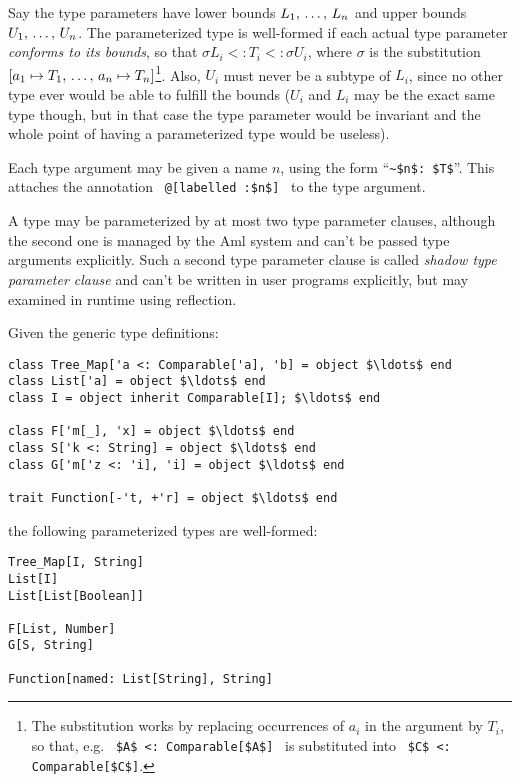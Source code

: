 Say the type parameters have lower bounds $L_1 ,\, \ldots ,\, L_n$ and upper bounds $U_1 ,\, \ldots ,\, U_n$. The parameterized type is well-formed if each actual type parameter {\em conforms to its bounds}, so that $\sigma L_i <: T_i <: \sigma U_i$, where $\sigma$ is the substitution $[a_1 \mapsto T_1 ,\, \ldots ,\, a_n \mapsto T_n]$\footnote{The substitution works by replacing occurrences of $a_i$ in the argument by $T_i$, so that, e.g. ~\lstinline!$A$ <: Comparable[$A$]!~ is substituted into ~\lstinline!$C$ <: Comparable[$C$]!.}. Also, $U_i$ must never be a subtype of $L_i$, since no other type ever would be able to fulfill the bounds ($U_i$ and $L_i$ may be the exact same type though, but in that case the type parameter would be invariant and the whole point of having a parameterized type would be useless). 

Each type argument may be given a name $n$, using the form ``\lstinline!~$n$: $T$!''. This attaches the annotation ~\lstinline!@[labelled :$n$]!~ to the type argument. 

A type may be parameterized by at most two type parameter clauses, although the second one is managed by the Aml system and can't be passed type arguments explicitly. Such a second type parameter clause is called {\em shadow type parameter clause} and can't be written in user programs explicitly, but may examined in runtime using reflection. 

\example
\label{example:parameterized-types}
Given the generic type definitions: 

\begin{lstlisting}
class Tree_Map['a <: Comparable['a], 'b] = object $\ldots$ end
class List['a] = object $\ldots$ end
class I = object inherit Comparable[I]; $\ldots$ end

class F['m[_], 'x] = object $\ldots$ end
class S['k <: String] = object $\ldots$ end
class G['m['z <: 'i], 'i] = object $\ldots$ end

trait Function[-'t, +'r] = object $\ldots$ end
\end{lstlisting}

the following parameterized types are well-formed: 

\begin{lstlisting}
Tree_Map[I, String]
List[I]
List[List[Boolean]]

F[List, Number]
G[S, String]

Function[named: List[String], String]
\end{lstlisting}

\example
\label{example:parameterized-types-mal}

